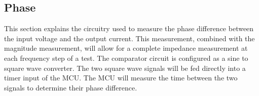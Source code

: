 \subsection{Phase}

This section explains the circuitry used to measure the phase difference between the input voltage and the output current. This measurement, combined with the magnitude measurement, will allow for a complete impedance measurement at each frequency step of a test. The comparator circuit is configured as a sine to square wave converter. The two square wave signals will be fed directly into a timer input of the MCU. The MCU will measure the time between the two signals to determine their phase difference.
